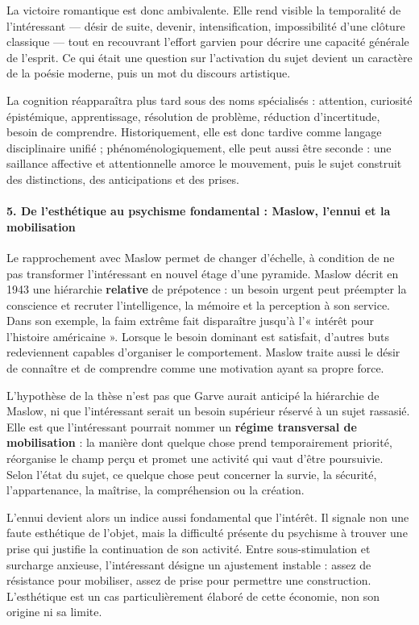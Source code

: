 \documentclass[10pt,a4paper]{article}
\begin{document}
La victoire romantique est donc ambivalente. Elle rend visible la temporalité de l'intéressant — désir de suite, devenir, intensification, impossibilité d'une clôture classique — tout en recouvrant l'effort garvien pour décrire une capacité générale de l'esprit. Ce qui était une question sur l'activation du sujet devient un caractère de la poésie moderne, puis un mot du discours artistique.

La cognition réapparaîtra plus tard sous des noms spécialisés : attention, curiosité épistémique, apprentissage, résolution de problème, réduction d'incertitude, besoin de comprendre. Historiquement, elle est donc tardive comme langage disciplinaire unifié ; phénoménologiquement, elle peut aussi être seconde : une saillance affective et attentionnelle amorce le mouvement, puis le sujet construit des distinctions, des anticipations et des prises.

\paragraph{5. De l'esthétique au psychisme fondamental : Maslow, l'ennui et la mobilisation}
Le rapprochement avec Maslow permet de changer d'échelle, à condition de ne pas transformer l'intéressant en nouvel étage d'une pyramide. Maslow décrit en 1943 une hiérarchie \textbf{relative} de prépotence : un besoin urgent peut préempter la conscience et recruter l'intelligence, la mémoire et la perception à son service. Dans son exemple, la faim extrême fait disparaître jusqu'à l'« intérêt pour l'histoire américaine ». Lorsque le besoin dominant est satisfait, d'autres buts redeviennent capables d'organiser le comportement. Maslow traite aussi le désir de connaître et de comprendre comme une motivation ayant sa propre force.

L'hypothèse de la thèse n'est pas que Garve aurait anticipé la hiérarchie de Maslow, ni que l'intéressant serait un besoin supérieur réservé à un sujet rassasié. Elle est que l'intéressant pourrait nommer un \textbf{régime transversal de mobilisation} : la manière dont quelque chose prend temporairement priorité, réorganise le champ perçu et promet une activité qui vaut d'être poursuivie. Selon l'état du sujet, ce quelque chose peut concerner la survie, la sécurité, l'appartenance, la maîtrise, la compréhension ou la création.

L'ennui devient alors un indice aussi fondamental que l'intérêt. Il signale non une faute esthétique de l'objet, mais la difficulté présente du psychisme à trouver une prise qui justifie la continuation de son activité. Entre sous-stimulation et surcharge anxieuse, l'intéressant désigne un ajustement instable : assez de résistance pour mobiliser, assez de prise pour permettre une construction. L'esthétique est un cas particulièrement élaboré de cette économie, non son origine ni sa limite.
\end{document}
